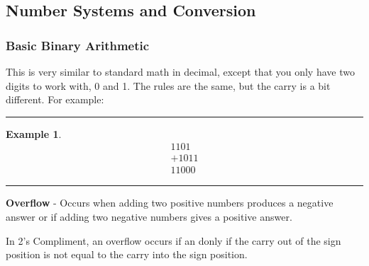 \documentclass[12pt]{article}
\newtheorem{example}{Example}
\newenvironment{examp}
{
    \vspace{0.5cm}
    \hrule
    \begin{example}\upshape
}
{
    \end{example}
    \hrule
    \vspace{0.5cm}
}
\begin{document}
\subsection{Number Systems and Conversion}
\subsubsection{Basic Binary Arithmetic}
This is very similar to standard math in decimal, except that
you only have two digits to work with, 0 and 1. The rules are
the same, but the carry is a bit different. For example:
\begin{examp}
	\[
		\begin{array}{r}
			1101  \\
			+1011 \\
			\hline
			11000
		\end{array}
	\]
\end{examp}

\textbf{Overflow} - Occurs when adding two positive numbers produces
a negative answer or if adding two negative numbers gives a positive
answer.

In 2's Compliment, an overflow occurs if an donly if the carry out
of the sign position is not equal to the carry into the sign position.
\end{document}
